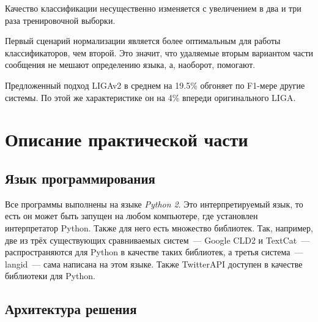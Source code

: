 \documentclass[a4paper, 14pt]{article}
\begin{document}
		Качество классификации несущественно изменяется с увеличением в два и три раза тренировочной выборки.
		
		Первый сценарий нормализации является более оптимальным для работы классификаторов, чем второй. Это значит, что удаляемые вторым вариантом части сообщения не мешают определению языка, а, наоборот, помогают.
		
		Предложенный подход LIGAv2 в среднем на 19.5\% обгоняет по F1-мере другие системы. По этой же характеристике он на 4\% впереди оригинального LIGA.
		
	
\pagebreak		

\section{Описание практической части}
		\subsection{Язык программирования}
		Все программы выполнены на языке \textit{Python 2}. Это интерпретируемый язык, то есть он может быть запущен на любом компьютере, где установлен интерпретатор Python. Также для него есть множество библиотек. Так, например, две из трёх существующих сравниваемых систем~--- Google CLD2 и TextCat~--- распространяются для Python в качестве таких библиотек, а третья система~--- langid~--- сама написана на этом языке. Также TwitterAPI доступен в качестве библиотеки для Python.
		
		\subsection{Архитектура решения}
\end{document}
